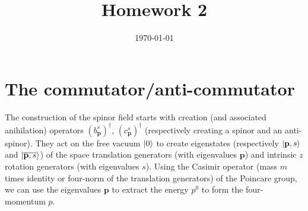 \documentclass[10pt, a4paper]{article}
\title{Homework 2} %
\author{\PA} %
\date{\today} %
\begin{document}
\maketitlepage

\maketableofcontents


\section{The commutator/anti-commutator}
The construction of the spinor field starts with creation (and associated anihilation) operators $(b_\mathbf{p}^s)^\dagger$, $(c_\mathbf{p}^s)^\dagger$ (respectively creating a spinor and an anti-spinor). They act on the free vacuum $\ket{0}$ to create eigenstates (respectively $\ket{\mathbf{p}, s}$ and $\ket{\overline{\mathbf{p}, s}}$) of the space translation generators (with eigenvalues $\mathbf{p}$) and intrinsic $z$ rotation generators (with eigenvalues $s$). Using the Casimir operator (mass $m$ times identity or four-norm of the translation generators) of the Poincare group, we can use the eigenvalues $\mathbf{p}$ to extract the energy $p^0$ to form the four-momentum $p$. 
\end{document}
